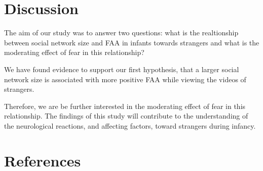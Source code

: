 \documentclass[
  man,
  floatsintext,
  longtable,
  nolmodern,
  notxfonts,
  notimes,
  colorlinks=true,linkcolor=blue,citecolor=blue,urlcolor=blue]{apa7}
\begin{document}
\section{Discussion}\label{discussion}

The aim of our study was to answer two questions: what is the
realtionship between social network size and FAA in infants towards
strangers and what is the moderating effect of fear in this
relationship?

We have found evidence to support our first hypothesis, that a larger
social network size is associated with more positive FAA while viewing
the videos of strangers.

Therefore, we are be further interested in the moderating effect of fear
in this relationship. The findings of this study will contribute to the
understanding of the neurological reactions, and affecting factors,
toward strangers during infancy.

\clearpage

\section{References}\label{references}
\end{document}
